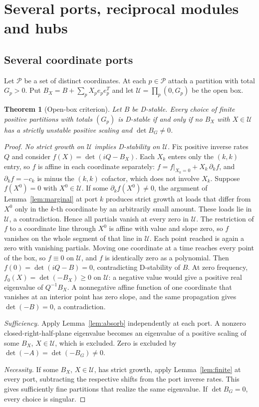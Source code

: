 \documentclass[11pt,a4paper]{article}
\theoremstyle{plain}
\newtheorem{theorem}{Theorem}[section]
\theoremstyle{definition}
\theoremstyle{remark}
\begin{document}
\section{Several ports, reciprocal modules and hubs}\label{sec:extensions}

\subsection{Several coordinate ports}
Let $\mathcal P$ be a set of distinct coordinates. At each $p\in\mathcal P$
attach a partition with total $G_p>0$. Put $B_X=B+\sum_{p}X_pe_pe_p^{T}$ and
let $\mathcal U=\prod_{p}(0,G_p)$ be the open box.

\begin{theorem}[Open-box criterion]\label{thm:box}
Let $B$ be D-stable. Every choice of finite positive partitions with totals
$(G_p)$ is D-stable if and only if no $B_X$ with $X\in\mathcal U$ has a strictly
unstable positive scaling and $\det B_G\ne0$.
\end{theorem}
\begin{proof}
\emph{No strict growth on $\mathcal U$ implies D-stability on $\mathcal U$.}
Fix positive inverse rates $Q$ and consider $f(X)=\det(iQ-B_X)$. Each $X_k$
enters only the $(k,k)$ entry, so $f$ is affine in each coordinate separately:
$f=f|_{X_k=0}+X_k\,\partial_kf$, and $\partial_kf=-c_k$ is minus the $(k,k)$
cofactor, which does not involve $X_k$. Suppose $f(X^0)=0$ with
$X^0\in\mathcal U$. If some $\partial_kf(X^0)\ne0$, the argument of
Lemma~\ref{lem:marginal} at port $k$ produces strict growth at loads that differ
from $X^0$ only in the $k$-th coordinate by an arbitrarily small amount. These
loads lie in $\mathcal U$, a contradiction. Hence all partials vanish at every
zero in $\mathcal U$. The restriction of $f$ to a coordinate line through $X^0$
is affine with value and slope zero, so $f$ vanishes on the whole segment of
that line in $\mathcal U$. Each point reached is again a zero with vanishing
partials. Moving one coordinate at a time reaches every point of the box, so
$f\equiv0$ on $\mathcal U$, and $f$ is identically zero as a polynomial. Then
$f(0)=\det(iQ-B)=0$, contradicting D-stability of $B$. At zero frequency,
$f_0(X)=\det(-B_X)\ge0$ on $\mathcal U$: a negative value would give a positive
real eigenvalue of $Q^{-1}B_X$. A nonnegative affine function of one coordinate
that vanishes at an interior point has zero slope, and the same propagation
gives $\det(-B)=0$, a contradiction.

\emph{Sufficiency.} Apply Lemma~\ref{lem:absorb} independently at each port.
A nonzero closed-right-half-plane eigenvalue becomes an eigenvalue of a
positive scaling of some $B_X$, $X\in\mathcal U$, which is excluded. Zero is
excluded by $\det(-A)=\det(-B_G)\ne0$.

\emph{Necessity.} If some $B_X$, $X\in\mathcal U$, has strict growth, apply
Lemma~\ref{lem:finite} at every port, subtracting the respective shifts from
the port inverse rates. This gives sufficiently fine partitions that realize
the same eigenvalue. If $\det B_G=0$, every choice is singular.
\end{proof}
\end{document}
